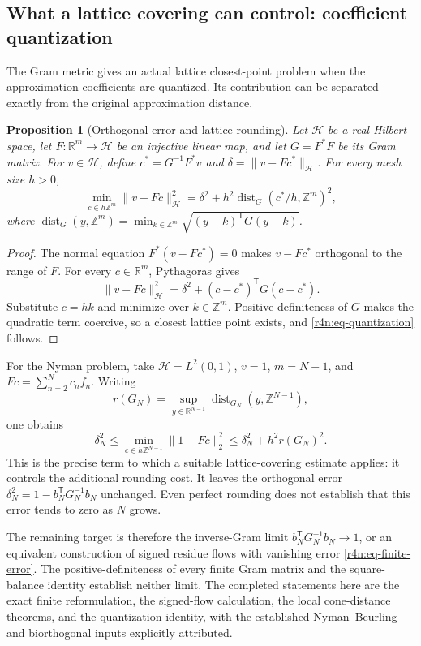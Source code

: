 \documentclass[11pt,a4paper]{article}
\newtheorem{proposition}[theorem]{Proposition}
\theoremstyle{definition}\newtheorem{definition}[theorem]{Definition}
\theoremstyle{remark}\newtheorem{remark}[theorem]{Remark}
\newcommand{\R}{\mathbb R}\newcommand{\Z}{\mathbb Z}
\numberwithin{equation}{section}
\begin{document}
\subsection{What a lattice covering can control: coefficient quantization}
\label{r4n:subsec-quantization}

The Gram metric gives an actual lattice closest-point problem when
the approximation coefficients are quantized.  Its contribution can
be separated exactly from the original approximation distance.

\begin{proposition}[Orthogonal error and lattice rounding]
\label{r4n:prop-quantization}
Let $\mathcal H$ be a real Hilbert space, let
$F:\R^m\to\mathcal H$ be an injective linear map, and let
$G=F^*F$ be its Gram matrix.
For $v\in\mathcal H$, define
$c^*=G^{-1}F^*v$ and $\delta=\|v-Fc^*\|_{\mathcal H}$.
For every mesh size $h>0$,
\begin{equation}
\label{r4n:eq-quantization}
 \min_{c\in h\Z^m}\|v-Fc\|_{\mathcal H}^2
 =\delta^2+
   h^2\operatorname{dist}_{G}
       (c^*/h,\Z^m)^2,
\end{equation}
where
$\operatorname{dist}_{G}(y,\Z^m)
=\min_{k\in\Z^m}\sqrt{(y-k)^{\mathsf T}G(y-k)}$.
\end{proposition}

\begin{proof}
The normal equation $F^*(v-Fc^*)=0$ makes
$v-Fc^*$ orthogonal to the range of $F$.
For every $c\in\R^m$, Pythagoras gives
\[
 \|v-Fc\|_{\mathcal H}^2
 =\delta^2+(c-c^*)^{\mathsf T}G(c-c^*).
\]
Substitute $c=hk$ and minimize over $k\in\Z^m$.
Positive definiteness of $G$ makes the quadratic term coercive,
so a closest lattice point exists, and
\eqref{r4n:eq-quantization} follows.
\end{proof}

For the Nyman problem, take $\mathcal H=L^2(0,1)$,
$v=1$, $m=N-1$, and $Fc=\sum_{n=2}^Nc_nf_n$.
Writing
\[
 r(G_N)=\sup_{y\in\R^{N-1}}
                 \operatorname{dist}_{G_N}(y,\Z^{N-1}),
\]
one obtains
\[
 \delta_N^2
 \le\min_{c\in h\Z^{N-1}}\|1-Fc\|_2^2
 \le\delta_N^2+h^2r(G_N)^2.
\]
This is the precise term to which a suitable lattice-covering
estimate applies: it controls the additional rounding cost.
It leaves the orthogonal error
$\delta_N^2=1-b_N^{\mathsf T}G_N^{-1}b_N$ unchanged.
Even perfect rounding does not establish that this error tends to
zero as $N$ grows.

The remaining target is therefore the inverse-Gram limit
$b_N^{\mathsf T}G_N^{-1}b_N\to1$, or an equivalent construction
of signed residue flows with vanishing error
\eqref{r4n:eq-finite-error}.
The positive-definiteness of every finite Gram matrix and the
square-balance identity establish neither limit.
The completed statements here are the exact finite reformulation,
the signed-flow calculation, the local cone-distance theorems, and
the quantization identity, with the established Nyman--Beurling
and biorthogonal inputs explicitly attributed.
\end{document}

